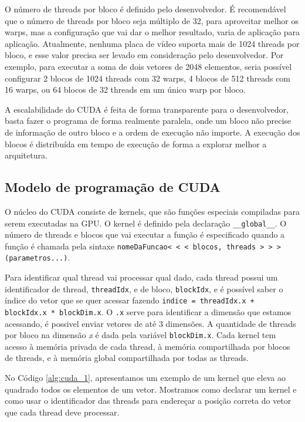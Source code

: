 O número de threads por bloco é definido pelo desenvolvedor. É recomendável que o número de threads por bloco seja múltiplo de 32, para aproveitar melhor os warps, mas a configuração que vai dar o melhor resultado, varia de aplicação para aplicação. Atualmente, nenhuma placa de vídeo suporta mais de 1024 threads por bloco, e esse valor precisa ser levado em consideração pelo desenvolvedor. Por exemplo, para executar a soma de dois vetores de 2048 elementos, seria possível configurar 2 blocos de 1024 threads com 32 warps, 4 blocos de 512 threads com 16 warps, ou 64 blocos de 32 threads em um único warp por bloco.

A escalabilidade do CUDA é feita de forma transparente para o desenvolvedor, basta fazer o programa de forma realmente paralela, onde um bloco não precise de informação de outro bloco e a ordem de execução não importe. A execução dos blocos é distribuída em tempo de execução de forma a explorar melhor a arquitetura.

\subsection{Modelo de programação de CUDA}
O núcleo do CUDA consiste de kernels, que são funções especiais compiladas para serem executadas na GPU. O kernel é definido pela declaração \texttt{\_\_global\_\_}. O número de threads e blocos que vai executar a função é especificado quando a função é chamada pela sintaxe \texttt{nomeDaFuncao< < < blocos, threads > > >(parametros...)}.

Para identificar qual thread vai processar qual dado, cada thread possui um identificador de thread, \texttt{threadIdx}, e de bloco, \texttt{blockIdx}, e é possível saber o índice do vetor que se quer acessar fazendo \texttt{indice = threadIdx.x + blockIdx.x * blockDim.x}. O \texttt{.x} serve para identificar a dimensão que estamos acessando, é possivel enviar vetores de até 3 dimensões. A quantidade de threads por bloco na dimensão {\em x} é dada pela variável \texttt{blockDim.x}.
Cada kernel tem acesso à memória privada de cada thread, à memória compartilhada por blocos de threads,  e à memória global compartilhada por todas as threads.

No Código \ref{alg:cuda_1}, apresentamos um exemplo de um kernel que eleva ao quadrado todos os elementos de um vetor. Mostramos como declarar um kernel e como usar o identificador das threads para endereçar a posição correta do vetor que cada thread deve processar.


